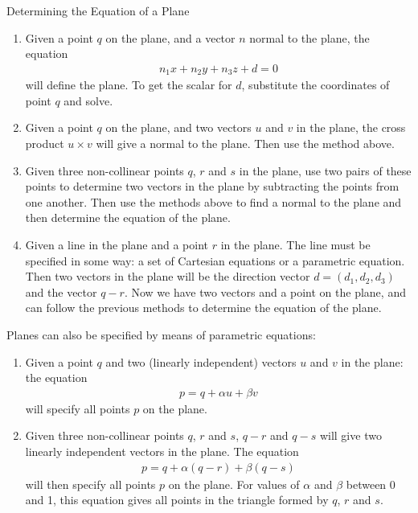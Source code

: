 \documentclass[../COS3712_Notes.tex]{subfiles}
\begin{document}
        \begin{sidenote}{Determining the Equation of a Plane}
          $ $\vspace{-1em}
          \begin{enumerate}
            \item Given a point $q$ on the plane, and a vector $n$ normal to the plane,
              the equation
              \begin{align*}
                n_1x + n_2y + n_3z + d = 0
              \end{align*}
              will define the plane.
              To get the scalar for $d$, substitute the coordinates of point $q$ and solve.
            \item Given a point $q$ on the plane, and two vectors $u$ and $v$ in the plane,
              the cross product $u \times v$ will give a normal to the plane.
              Then use the method above.
            \item Given three non-collinear points $q$, $r$ and $s$ in the plane,
              use two pairs of these points to determine two vectors in the plane
              by subtracting the points from one another.
              Then use the methods above to find a normal to the plane and then determine
              the equation of the plane.
            \item Given a line in the plane and a point $r$ in the plane.
              The line must be specified in some way: a set of Cartesian equations
              or a parametric equation.
              Then two vectors in the plane will be the direction vector $d = (d_1, d_2, d_3)$
              and the vector $q - r$.
              Now we have two vectors and a point on the plane, and can follow the previous methods
              to determine the equation of the plane.
          \end{enumerate}
        \end{sidenote}

        Planes can also be specified by means of parametric equations:
        \begin{enumerate}
          \item Given a point $q$ and two (linearly independent) vectors $u$ and $v$ in the plane:
            the equation
            \begin{align*}
              p = q + \alpha u + \beta v
            \end{align*}
            will specify all points $p$ on the plane.
          \item Given three non-collinear points $q$, $r$ and $s$, $q - r$ and $q - s$
            will give two linearly independent vectors in the plane.
            The equation
            \begin{align*}
              p = q + \alpha (q - r) + \beta (q - s)
            \end{align*}
            will then specify all points $p$ on the plane.
            For values of $\alpha$ and $\beta$ between 0 and 1, this equation gives all points
            in the triangle formed by $q$, $r$ and $s$.
        \end{enumerate}
\end{document}
